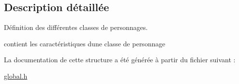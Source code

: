 \subsection{Description détaillée}
Définition des différentes classes de personnages. 

contient les caractéristiques d\textquotesingle{}une classe de personnage 

La documentation de cette structure a été générée à partir du fichier suivant \+:\begin{DoxyCompactItemize}
\item 
\hyperlink{a00020}{global.\+h}\end{DoxyCompactItemize}
